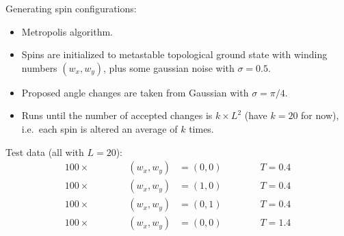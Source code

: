 \documentclass[11pt]{article}
\begin{document}
\bigskip\bigskip

Generating spin configurations:
\begin{itemize}
	\item Metropolis algorithm.
	\item Spins are initialized to metastable topological ground state with winding numbers $(w_x,w_y)$, plus some gaussian noise with $\sigma=0.5$.
	\item Proposed angle changes are taken from Gaussian with $\sigma=\pi/4$.
	\item Runs until the number of accepted changes is $k\times L^2$ (have $k=20$ for now), i.e.~each spin is altered an average of $k$ times.
\end{itemize}

Test data (all with $L=20$):
\begin{align*}
	100\times \qquad\qquad (w_x,w_y) &= (0,0) \qquad\qquad T=0.4\\
	100\times \qquad\qquad (w_x,w_y) &= (1,0) \qquad\qquad T=0.4\\
	100\times \qquad\qquad (w_x,w_y) &= (0,1) \qquad\qquad T=0.4\\
	100\times \qquad\qquad (w_x,w_y) &= (0,0) \qquad\qquad T=1.4
\end{align*}
\end{document}
